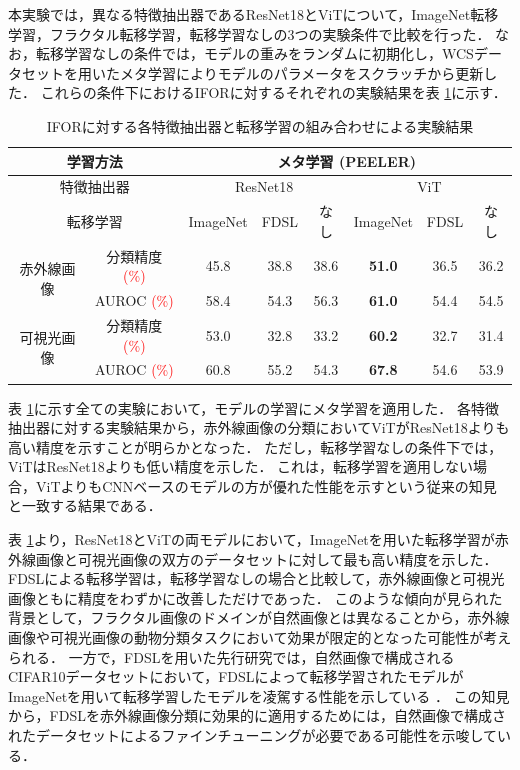 \documentclass[a4paper,11pt,nomag]{jsreport}
\begin{document}
本実験では，異なる特徴抽出器であるResNet18とViTについて，ImageNet転移学習，フラクタル転移学習，転移学習なしの3つの実験条件で比較を行った．
なお，転移学習なしの条件では，モデルの重みをランダムに初期化し，WCSデータセットを用いたメタ学習によりモデルのパラメータをスクラッチから更新した．
これらの条件下におけるIFORに対するそれぞれの実験結果を表 \ref{tbl:exp1}に示す．
% 
\begin{table}[tbp]
  \centering
  \caption{IFORに対する各特徴抽出器と転移学習の組み合わせによる実験結果}
  \label{tbl:exp1}

  \begin{tabular}{cc||c|c|c|c|c|c}
      \hline
      \multicolumn{2}{c||}{学習方法}            & \multicolumn{6}{c}{メタ学習 (PEELER)}                        \\ \hline
      \multicolumn{2}{c||}{特徴抽出器}           & \multicolumn{3}{c|}{ResNet18} & \multicolumn{3}{c}{ViT}     \\ \hline
      \multicolumn{2}{c||}{転移学習}            &  ImageNet  &  FDSL  &  なし   &   ImageNet    & FDSL & なし  \\ \hline\hline
      \multirow{2}{*}{赤外線画像} & 分類精度 \textcolor{red}{(\%)} &    45.8    &  38.8  &  38.6  & \textbf{51.0} & 36.5 & 36.2 \\
                                & AUROC \textcolor{red}{(\%)}   &    58.4    &  54.3  &  56.3  & \textbf{61.0} & 54.4 & 54.5 \\ \hline
      \multirow{2}{*}{可視光画像} & 分類精度 \textcolor{red}{(\%)} &    53.0    &  32.8  &  33.2  & \textbf{60.2} & 32.7 & 31.4 \\
                                & AUROC \textcolor{red}{(\%)}   &    60.8    &  55.2  &  54.3  & \textbf{67.8} & 54.6 & 53.9 \\ \hline
  \end{tabular}
\end{table}
% 
表 \ref{tbl:exp1}に示す全ての実験において，モデルの学習にメタ学習を適用した．
各特徴抽出器に対する実験結果から，赤外線画像の分類においてViTがResNet18よりも高い精度を示すことが明らかとなった．
ただし，転移学習なしの条件下では，ViTはResNet18よりも低い精度を示した．
これは，転移学習を適用しない場合，ViTよりもCNNベースのモデルの方が優れた性能を示すという従来の知見 \cite{vit}と一致する結果である．

表 \ref{tbl:exp1}より，ResNet18とViTの両モデルにおいて，ImageNetを用いた転移学習が赤外線画像と可視光画像の双方のデータセットに対して最も高い精度を示した．
FDSLによる転移学習は，転移学習なしの場合と比較して，赤外線画像と可視光画像ともに精度をわずかに改善しただけであった．
このような傾向が見られた背景として，フラクタル画像のドメインが自然画像とは異なることから，赤外線画像や可視光画像の動物分類タスクにおいて効果が限定的となった可能性が考えられる．
一方で，FDSLを用いた先行研究では，自然画像で構成されるCIFAR10データセットにおいて，FDSLによって転移学習されたモデルがImageNetを用いて転移学習したモデルを凌駕する性能を示している \cite{fdsl}．
この知見から，FDSLを赤外線画像分類に効果的に適用するためには，自然画像で構成されたデータセットによるファインチューニングが必要である可能性を示唆している．
\end{document}
